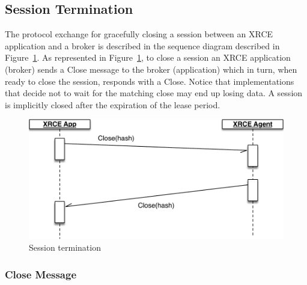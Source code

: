 \documentclass[a4paper,oneside,article]{memoir}
\begin{document}
\subsection{Session Termination}

The protocol exchange for gracefully closing a session between an XRCE application and a broker is
described in the sequence diagram described in Figure~\ref{fig:close-session}.  As represented in
Figure~\ref{fig:close-session}, to close a session an XRCE application (broker) sends a Close message
to the broker (application) which in turn, when ready to close the session, responds with a Close.
Notice that implementations that decide not to wait for the matching close may end up losing data.
A session is implicitly closed after the expiration of the lease period.
 
\begin{figure}
\centering
\includegraphics[scale=0.6]{close-session.pdf}
\caption{Session termination}\label{fig:close-session}
\end{figure}

\subsubsection{Close Message}
\end{document}
